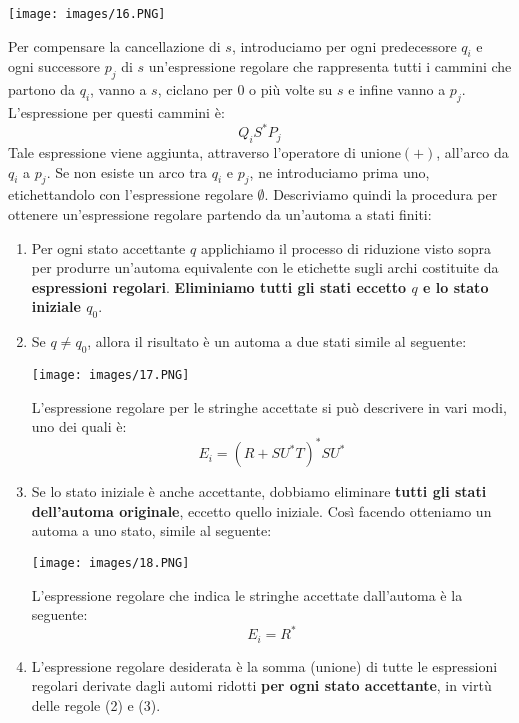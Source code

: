 \documentclass[12pt]{article}
\begin{document}
\begin{center}
    \texttt{[image: images/16.PNG]}
\end{center}
Per compensare la cancellazione di $s$, introduciamo per ogni predecessore $q_i$ e ogni successore $p_j$ di $s$ un'espressione regolare che rappresenta tutti i cammini che partono da $q_i$, vanno a $s$, ciclano per 0 o più volte su $s$ e infine vanno a $p_j$. L'espressione per questi cammini è:
$$Q_iS^*P_j$$
Tale espressione viene aggiunta, attraverso l'operatore di unione$(+)$, all'arco da $q_i$ a $p_j$. Se non esiste un arco tra $q_i$ e $p_j$, ne introduciamo prima uno, etichettandolo con l'espressione regolare $\emptyset$. \newline
Descriviamo quindi la procedura per ottenere un'espressione regolare partendo da un'automa a stati finiti:
\begin{enumerate}
    \item Per ogni stato accettante $q$ applichiamo il processo di riduzione visto sopra per produrre un'automa equivalente con le etichette sugli archi costituite da \textbf{espressioni regolari}. \textbf{Eliminiamo tutti gli stati eccetto $q$ e lo stato iniziale $q_0$}.
    \item Se $q \neq q_0$, allora il risultato è un automa a due stati simile al seguente:
        \begin{center}
            \hspace{-2cm}
            \texttt{[image: images/17.PNG]}
        \end{center}
    L'espressione regolare per le stringhe accettate si può descrivere in vari modi, uno dei quali è:
    $$E_i = (R + SU^*T)^* SU^*$$
    \item Se lo stato iniziale è anche accettante, dobbiamo eliminare \textbf{tutti gli stati dell'automa originale}, eccetto quello iniziale. Così facendo otteniamo un automa a uno stato, simile al seguente:
        \begin{center}
            \hspace{-2cm}
            \texttt{[image: images/18.PNG]}
        \end{center}
    L'espressione regolare che indica le stringhe accettate dall'automa è la seguente:
    $$E_i = R^*$$
    \item L'espressione regolare desiderata è la somma (unione) di tutte le espressioni regolari derivate dagli automi ridotti \textbf{per ogni stato accettante}, in virtù delle regole (2) e (3).
\end{enumerate}
\end{document}
